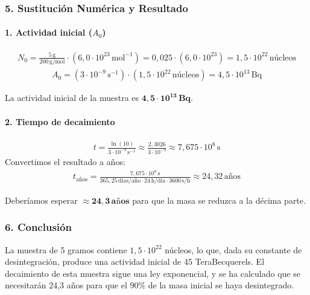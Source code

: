 \subsubsection*{5. Sustitución Numérica y Resultado}
\paragraph{1. Actividad inicial ($A_0$)}
\begin{gather}
    N_0 = \frac{5\,\text{g}}{200\,\text{g/mol}} \cdot (6,0 \cdot 10^{23}\,\text{mol}^{-1}) = 0,025 \cdot (6,0 \cdot 10^{23}) = 1,5 \cdot 10^{22}\,\text{núcleos}
\end{gather}
\begin{gather}
    A_0 = (3 \cdot 10^{-9}\,\text{s}^{-1}) \cdot (1,5 \cdot 10^{22}\,\text{núcleos}) = 4,5 \cdot 10^{13}\,\text{Bq}
\end{gather}
\begin{cajaresultado}
La actividad inicial de la muestra es $\boldsymbol{4,5 \cdot 10^{13}\,\textbf{Bq}}$.
\end{cajaresultado}

\paragraph{2. Tiempo de decaimiento}
\begin{gather}
    t = \frac{\ln(10)}{3 \cdot 10^{-9}\,\text{s}^{-1}} \approx \frac{2,3026}{3 \cdot 10^{-9}} \approx 7,675 \cdot 10^8\,\text{s}
\end{gather}
Convertimos el resultado a años:
\begin{gather}
    t_{\text{años}} = \frac{7,675 \cdot 10^8\,\text{s}}{365,25\,\text{días/año} \cdot 24\,\text{h/día} \cdot 3600\,\text{s/h}} \approx 24,32\,\text{años}
\end{gather}
\begin{cajaresultado}
Deberíamos esperar $\boldsymbol{\approx 24,3\,\textbf{años}}$ para que la masa se reduzca a la décima parte.
\end{cajaresultado}

\subsubsection*{6. Conclusión}
\begin{cajaconclusion}
La muestra de 5 gramos contiene $1,5 \cdot 10^{22}$ núcleos, lo que, dada su constante de desintegración, produce una actividad inicial de 45 TeraBecquerels. El decaimiento de esta muestra sigue una ley exponencial, y se ha calculado que se necesitarán 24,3 años para que el 90\% de la masa inicial se haya desintegrado.
\end{cajaconclusion}

